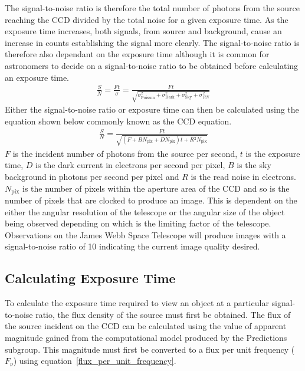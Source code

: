 			The signal-to-noise ratio is therefore the total number of photons from the source reaching the CCD divided by the total noise for a given exposure time. As the exposure time increases, both signals, from source and background, cause an increase in counts establishing the signal more clearly. The signal-to-noise ratio is therefore also dependant on the exposure time although it is common for astronomers to decide on a signal-to-noise ratio to be obtained before calculating an exposure time.
			\begin{align}
				\frac{S}{N} = \frac{Ft}{\sigma} =\frac{Ft}{\sqrt{\sigma_\text{Poisson}^{2} + \sigma_\text{Dark}^{2} + \sigma_\text{Sky}^{2} + \sigma_{RN}^{2}}}
			\end{align}
			Either the signal-to-noise ratio or exposure time can then be calculated using the equation shown below commonly known as the CCD equation.
			\begin{align}
				\frac{S}{N} = \frac{Ft}{\sqrt{(F + BN_\text{pix} + DN_\text{pix})t + R{^2}N_\text{pix}}}
			\end{align}
			$F$ is the incident number of photons from the source per second, $t$ is the exposure time, $D$ is the dark current in electrons per second per pixel, $B$ is the sky background in photons per second per pixel and $R$ is the read noise in electrons. $N_\text{pix}$ is the number of pixels within the aperture area of the CCD and so is the number of pixels that are clocked to produce an image. This is dependent on the either the angular resolution of the telescope or the angular size of the object being observed depending on which is the limiting factor of the telescope. Observations on the James Webb Space Telescope will produce images with a signal-to-noise ratio of 10 indicating the current image quality desired.

	\subsection{Calculating Exposure Time} %
	\label{sub:calculating_exposure_time}
		To calculate the exposure time required to view an object at a particular signal-to-noise ratio, the flux density of the source must first be obtained. The flux of the source incident on the CCD can be calculated using the value of apparent magnitude gained from the computational model produced by the Predictions subgroup. This magnitude must first be converted to a flux per unit frequency ($F_\nu$) using equation~\ref{flux_per_unit_frequency}.

